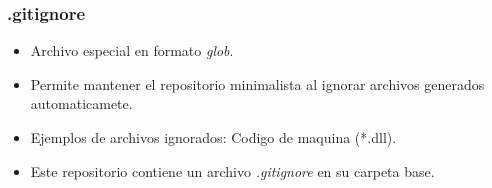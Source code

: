 \documentclass{beamer}
\begin{document}
\begin{frame}

\frametitle{.gitignore}

\begin{itemize}

    \item Archivo especial en formato \emph{glob}\cite{Gitignore}.

    \item Permite mantener el repositorio minimalista al ignorar archivos generados automaticamete.

    \item Ejemplos de archivos ignorados: Codigo de maquina (*.dll).

    \item Este repositorio contiene un archivo \emph{.gitignore} en su carpeta base.

\end{itemize}

\end{frame}



\begin{frame}





\end{frame}
\end{document}
